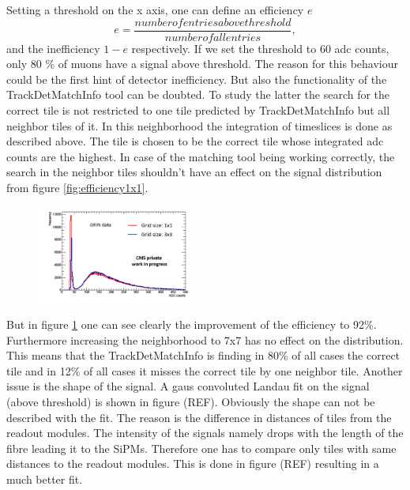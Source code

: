 			Setting a threshold on the x axis, one can define an efficiency $e$
			\begin{equation}
				e = \frac{number of entries above threshold}{number of all entries},
			\end{equation}
			and the inefficiency $1-e$ respectively.
			If we set the threshold to 60 adc counts, only 80 \% of muons have a signal above threshold.
			The reason for this behaviour could be the first hint of detector inefficiency.
			But also the functionality of the TrackDetMatchInfo tool can be doubted.
			To study the latter the search for the correct tile is not restricted to one tile predicted by TrackDetMatchInfo but all neighbor tiles of it.
			In this neighborhood the integration of timeslices is done as described above.
			The tile is chosen to be the correct tile whose integrated adc counts are the highest.
			In case of the matching tool being working correctly, the search in the neighbor tiles shouldn't have an effect on the signal distribution from figure \ref{fig:efficiency1x1}.
			\begin{figure}[htbp]
				\centering
				\includegraphics[width=0.45\textwidth]{Figures/erdogan/neighborhood.png}
				\caption{}
				\label{fig:neighborhood}
			\end{figure}
			But in figure \ref{fig:neighborhood} one can see clearly the improvement of the efficiency to 92\%.
			Furthermore increasing the neighborhood to 7x7 has no effect on the distribution.
			This means that the TrackDetMatchInfo is finding in 80\% of all cases the correct tile and in 12\% of all cases it misses the correct tile by one neighbor tile.
			Another issue is the shape of the signal.
			A gaus convoluted Landau fit on the signal (above threshold) is shown in figure (REF).
			Obviously the shape can not be described with the fit.
			The reason is the difference in distances of tiles from the readout modules.
			The intensity of the signals namely drops with the length of the fibre leading it to the SiPMs.
			Therefore one has to compare only tiles with same distances to the readout modules.
			This is done in figure (REF) resulting in a much better fit.  
